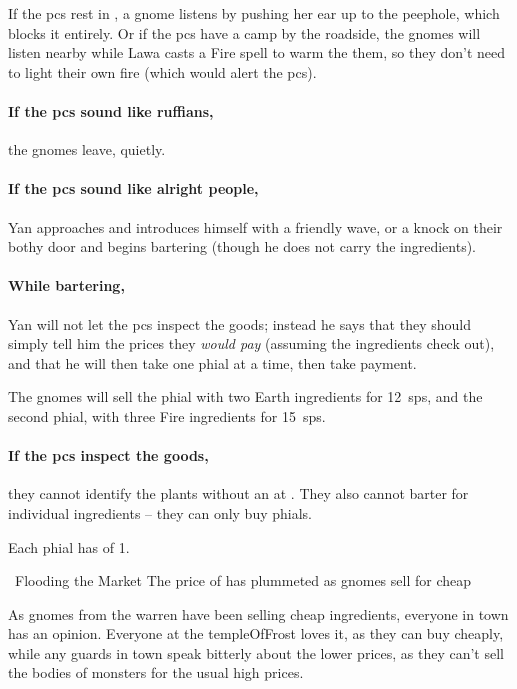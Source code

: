 If the \glspl{pc} rest in , a gnome listens by pushing her ear up to the peephole, which blocks it entirely.
Or if the \glspl{pc} have a camp by the roadside, the gnomes will listen nearby while Lawa casts a Fire spell to warm the them, so they don't need to light their own fire (which would alert the \glspl{pc}).

\paragraph{If the \glspl{pc} sound like ruffians,}
the gnomes leave, quietly.

\paragraph{If the \glspl{pc} sound like alright people,}
Yan approaches and introduces himself with a friendly wave, or a knock on their \gls{bothy} door and begins bartering (though he does not carry the \glspl{ingredient}).

\paragraph{While bartering,}
Yan will not let the \glspl{pc} inspect the goods; instead he says that they should simply tell him the prices they \textit{would pay} (assuming the \glspl{ingredient} check out), and that he will then take one phial at a time, then take payment.

\Yan[\rations]

The gnomes will sell the phial with two Earth \glspl{ingredient} for 12~\glspl{sp}, and the second phial, with three Fire \glspl{ingredient} for 15~\glspl{sp}.

\paragraph{If the \glspl{pc} inspect the goods,}
they cannot identify the plants without an  at \tn[12].
They also cannot barter for individual \glspl{ingredient} -- they can only buy phials.

Each phial has  of 1.

{\squash~Flooding the Market}%
{The price of  has plummeted as gnomes sell for cheap}%

\begin{exampletext}
  As gnomes from the \gls{warren} have been selling cheap \glspl{ingredient}, everyone in town has an opinion.
  Everyone at the \gls{templeOfFrost} loves it, as they can buy cheaply, while any \glspl{guard} in town speak bitterly about the lower prices, as they can't sell the bodies of \glspl{monster} for the usual high prices.
\end{exampletext}


